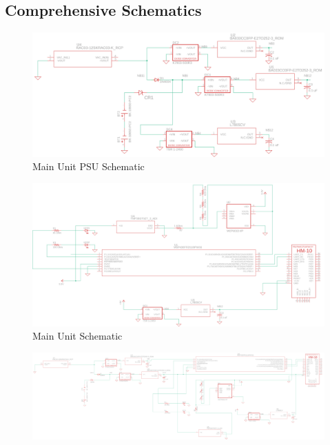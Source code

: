 \documentclass[12pt]{article}
\begin{document}
\appendix
\begin{landscape}
\section{Comprehensive Schematics}
  \begin{center}
  \begin{figure}[H]
    \includegraphics[width=1.6\textwidth, left]{../Modular Design/Main-Unit-PSU/Figures/main-unit-psu.png}
    \caption{Main Unit PSU Schematic}
    \label{fig:main-psu-schematic}
  \end{figure}
  \end{center}
  \begin{center}
  \begin{figure}[H]
    \includegraphics[width=1.6\textwidth, left]{../Appendix/Figures/Main-Unit.png}
    \caption{Main Unit Schematic}
    \label{fig:main-schematic}
  \end{figure}
  \end{center}
  \begin{center}
  \begin{figure}[H]
    \includegraphics[width=\pdfpagewidth,height=0.65\textheight]{../Modular Design/Main-Unit/Figures/main-unit-and-psu.png}

\end{figure}
\end{center}
\end{landscape}
\end{document}
